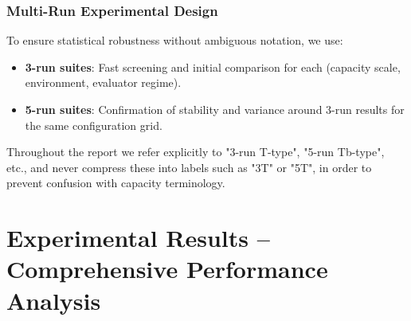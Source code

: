 \documentclass[12pt,a4paper]{article}
\begin{document}
\subsubsection{Multi-Run Experimental Design}

To ensure statistical robustness without ambiguous notation, we use:

\begin{itemize}
\item \textbf{3-run suites}: Fast screening and initial comparison for each (capacity scale, environment, evaluator regime).
\item \textbf{5-run suites}: Confirmation of stability and variance around 3-run results for the same configuration grid.
\end{itemize}

Throughout the report we refer explicitly to "3-run T-type", "5-run Tb-type", etc., and never compress these into labels such as "3T" or "5T", in order to prevent confusion with capacity terminology.

\newpage
\section{Experimental Results – Comprehensive Performance Analysis}
\end{document}
